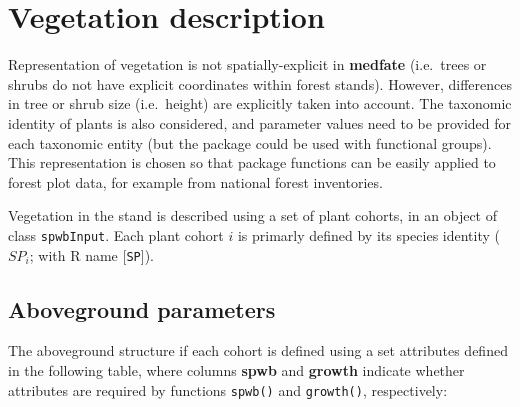 \documentclass[]{book}
\begin{document}
\hypertarget{vegetation-description}{%
\section{Vegetation description}\label{vegetation-description}}

Representation of vegetation is not spatially-explicit in \textbf{medfate} (i.e.~trees or shrubs do not have explicit coordinates within forest stands). However, differences in tree or shrub size (i.e.~height) are explicitly taken into account. The taxonomic identity of plants is also considered, and parameter values need to be provided for each taxonomic entity (but the package could be used with functional groups). This representation is chosen so that package functions can be easily applied to forest plot data, for example from national forest inventories.

Vegetation in the stand is described using a set of plant cohorts, in an object
of class \texttt{spwbInput}. Each plant cohort \(i\) is primarly defined by its
species identity (\(SP_i\); with R name {[}\texttt{SP}{]}).

\hypertarget{aboveground-parameters}{%
\subsection{Aboveground parameters}\label{aboveground-parameters}}

The aboveground structure if each cohort is defined using a set attributes defined in the following table, where columns \textbf{spwb} and \textbf{growth} indicate whether attributes are required by functions \texttt{spwb()} and \texttt{growth()}, respectively:
\end{document}
